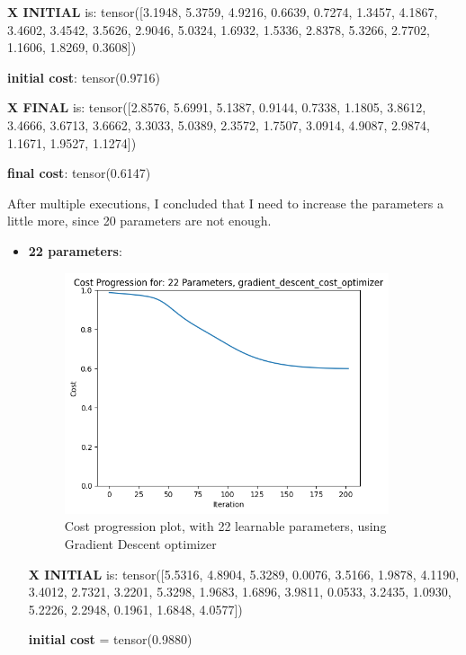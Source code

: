 \documentclass[inscr,ack,preface]{diphdthesis}
\begin{document}
\textbf{X INITIAL} is: tensor([3.1948, 5.3759, 4.9216, 0.6639, 0.7274, 1.3457, 4.1867, 3.4602, 3.4542,
        3.5626, 2.9046, 5.0324, 1.6932, 1.5336, 2.8378, 5.3266, 2.7702, 1.1606,
        1.8269, 0.3608])

\textbf{initial cost}: tensor(0.9716)

\textbf{X FINAL} is: tensor([2.8576, 5.6991, 5.1387, 0.9144, 0.7338, 1.1805, 3.8612, 3.4666, 3.6713, 3.6662, 3.3033, 5.0389, 2.3572, 1.7507, 3.0914, 4.9087, 2.9874, 1.1671, 1.9527, 1.1274])

\textbf{final cost}: tensor(0.6147)


After multiple executions, I concluded that I need to increase the parameters a little more, since 20 parameters are not enough.

\begin{itemize}
    \item \textbf{22 parameters}:

\begin{figure}[ht]
\begin{center}
    \includegraphics[width=0.9\textwidth]{22.png}
    \caption{Cost progression plot, with 22 learnable parameters, using Gradient Descent optimizer} 
    \label{fig:enter-label}
    \end{center}
\end{figure}

\textbf{X INITIAL} is:
 tensor([5.5316, 4.8904, 5.3289, 0.0076, 3.5166, 1.9878, 4.1190, 3.4012, 2.7321,
        3.2201, 5.3298, 1.9683, 1.6896, 3.9811, 0.0533, 3.2435, 1.0930, 5.2226,
        2.2948, 0.1961, 1.6848, 4.0577])
        
\textbf{initial cost} = tensor(0.9880)


\end{itemize}
\end{document}
